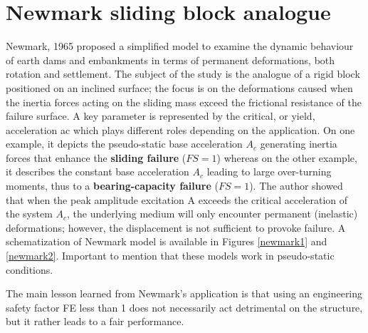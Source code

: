 \documentclass[11pt,a4paper]{report}
\begin{document}
\section{Newmark sliding block analogue}
Newmark, 1965 \cite{veletsos1965deformation} proposed a simplified model to examine the dynamic behaviour of earth dams and embankments in terms of permanent deformations, both rotation and settlement. The subject of the study is the analogue of a rigid block positioned on an inclined surface; the focus is on the deformations caused when the inertia forces acting on the sliding mass exceed the frictional resistance of the failure surface. A key parameter is represented by the critical, or yield, acceleration \gls{ac} which plays different roles depending on the application. On one example, it depicts the pseudo-static base acceleration $A_c$ generating inertia forces that enhance the \textbf{sliding failure} ($FS=1$) whereas on the other example, it describes the constant base acceleration $A_c$ leading to large over-turning moments, thus to a \textbf{bearing-capacity failure} ($FS=1$). The author showed that when the peak amplitude excitation A exceeds the critical acceleration of the system $A_c$, the underlying medium will only encounter permanent (inelastic) deformations; however, the displacement is not sufficient to provoke failure. A schematization of Newmark model is available in Figures \ref{newmark1} and \ref{newmark2}. Important to mention that these models work in pseudo-static conditions. 

The main lesson learned from Newmark's application is that using an engineering safety factor \gls{FE} less than 1 does not necessarily act detrimental on the structure, but it rather leads to a fair performance.
 
\end{document}
